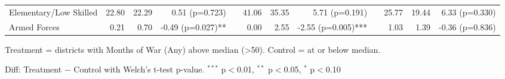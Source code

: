\begin{table}[htbp]
\begin{tabular}{l rrr c rrr c rrr}
\quad Elementary/Low Skilled & 22.80 & 22.29 & 0.51 (p=0.723) &  & 41.06 & 35.35 & 5.71 (p=0.191) &  & 25.77 & 19.44 & 6.33 (p=0.330) \\
\quad Armed Forces & 0.21 & 0.70 & -0.49 (p=0.027)** &  & 0.00 & 2.55 & -2.55 (p=0.005)*** &  & 1.03 & 1.39 & -0.36 (p=0.836) \\
\bottomrule
\end{tabular}
\begin{tablenotes}
\small
\item Treatment = districts with Months of War (Any) above median (>50). Control = at or below median.
\item Diff: Treatment $-$ Control with Welch's t-test p-value. $^{{***}}$ p$<$0.01, $^{{**}}$ p$<$0.05, $^{{*}}$ p$<$0.10
\end{tablenotes}
\end{table}

\clearpage

